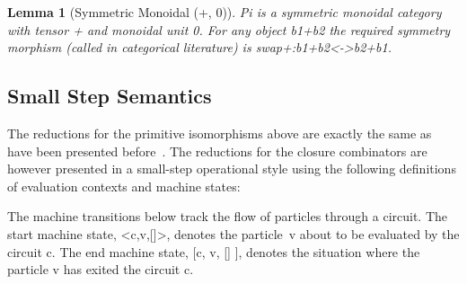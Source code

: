 \documentclass[preprint]{sigplanconf}
\newtheorem{lemma}[theorem]{Lemma}
\begin{document}
\begin{lemma}[Symmetric Monoidal (+, 0)]
  {{Pi}} is a symmetric monoidal category with tensor {{+}} and
  monoidal unit {{0}}. For any object {{b1+b2}} the required symmetry
  morphism (called in categorical literature) is
  {{swap+:b1+b2<->b2+b1}}.
\end{lemma}


\subsection{Small Step Semantics}

The reductions for the primitive isomorphisms above are exactly the same as
have been presented before~\cite{infeffects}. The reductions for the closure
combinators are however presented in a small-step operational style using the
following definitions of evaluation contexts and machine states:

\begin{scriptsize}
\end{scriptsize}
The machine transitions below track the flow of particles through a
circuit. The start machine state, {{<c,v,[]>}}, denotes the
particle~{{v}} about to be evaluated by the circuit {{c}}. The end
machine state, {{[c, v, [] ]}}, denotes the situation where the particle
{{v}} has exited the circuit {{c}}.
\end{document}
